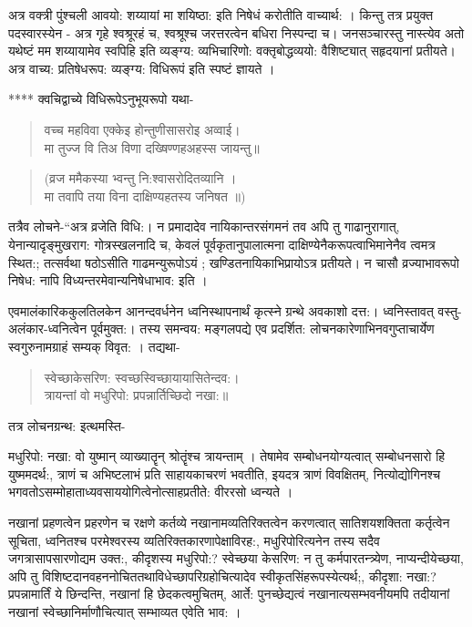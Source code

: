 अत्र वक्त्री पुंश्चली आवयो: शय्यायां मा शयिष्ठा: इति निषेधं करोतीति वाच्यार्थ: । किन्तु तत्र प्रयुक्त पदस्वारस्येन - अत्र गृहे श्वश्रूरहं च, श्वश्रूश्च जरत्तरत्वेन बधिरा निस्पन्दा च। जनसञ्चारस्तु नास्त्येव अतो यथेष्टं मम शय्यायामेव स्वपिहि इति व्यङ्ग्य: व्यभिचारिणो: वक्तृबोद्धव्ययो: वैशिष्ट्यात् सहृदयानां प्रतीयते। अत्र वाच्य: प्रतिषेधरूप: व्यङ्ग्य: विधिरूपं इति स्पष्टं ज्ञायते ।

****
क्वचिद्वाच्ये विधिरूपेऽनुभूयरूपो यथा-
\begin{verse}
वच्च महविवा एक्केइ होन्तुणीसासरोइ अव्वाई।\\
मा तुज्ज वि तिअ विणा दख्षिण्णहअहस्स जायन्तु॥
\end{verse}
\begin{verse}
(व्रज ममैकस्या भ्वन्तु नि:श्वासरोदितव्यानि ।\\
मा तवापि तया विना दाक्षिण्यहतस्य जनिषत ॥)
\end{verse}
तत्रैव लोचने-“अत्र व्रजेति विधि:। न प्रमादादेव नायिकान्तरसंगमनं तव अपि तु गाढानुरागात्, येनान्यादृङ्मुखराग: गोत्रस्खलनादि च, केवलं पूर्वकृतानुपालात्मना दाक्षिण्येनैकरूपत्वाभिमानेनैव त्वमत्र स्थित:; तत्सर्वथा षठोऽसीति गाढमन्युरूपोऽयं ; खण्डितनायिकाभिप्रायोऽत्र प्रतीयते। न चासौ व्रज्याभावरूपो निषेध: नापि विध्यन्तरमेवान्यनिषेधाभाव: इति ।

एवमालंकारिककुलतिलकेन आनन्दवर्धनेन ध्वनिस्थापनार्थं कृत्स्ने ग्रन्थे अवकाशो दत्त:। ध्वनिस्तावत् वस्तु-अलंकार-ध्वनित्वेन पूर्वमुक्त:। तस्य समन्वय: मङ्गलपद्ये एव प्रदर्शित: लोचनकारेणाभिनवगुप्ताचार्येण स्वगुरुनामग्राहं सम्यक् विवृत: । तद्यथा-
\begin{verse}
स्वेच्छाकेसरिण: स्वच्छस्विच्छायायासितेन्दव:।\\
त्रायन्तां वो मधुरिपो: प्रपन्नार्तिच्छिदो नखा:॥
\end{verse}
तत्र लोचनग्रन्थ: इत्थमस्ति-

मधुरिपो: नखा: वो युष्मान् व्याख्यातॄन् श्रोतॄंश्च त्रायन्ताम् । तेषामेव सम्बोधनयोग्यत्वात् सम्बोधनसारो हि युष्ममदर्थ:, त्राणं च अभिष्टलाभं प्रति साहायकाचरणं भवतीति, इयदत्र त्राणं विवक्षितम्, नित्योद्योगिनश्च भगवतोऽसम्मोहाताध्यवसाययोगित्वेनोत्साहप्रतीते: वीररसो ध्वन्यते ।

नखानां प्रहणत्वेन प्रहरणेन च रक्षणे कर्तव्ये नखानामव्यतिरिक्तत्वेन करणत्वात् सातिशयशक्तिता कर्तृत्वेन सूचिता, ध्वनितश्च परमेश्वरस्य व्यतिरिक्तकारणापेक्षाविरह:, मधुरिपोरित्यनेन तस्य सदैव जगत्रासापसारणोद्यम उक्त:, कीदृशस्य मधुरिपो:? स्वेच्छया केसरिण: न तु कर्मपारतन्त्र्येण, नाप्यन्दीयेच्छया, अपि तु विशिष्टदानवहननोचिततथाविधेच्छापरिग्रहोचित्यादेव स्वीकृतसिंहरूपस्येत्यर्थ;, कीदृशा: नखा:? प्रपन्नामार्तिं ये छिन्दन्ति, नखानां हि छेदकत्वमुचितम्, आर्ते: पुनच्छेद्यत्वं नखानात्यसम्भवनीयमपि तदीयानां नखानां स्वेच्छानिर्माणौचित्यात् सम्भाव्यत एवेति भाव: ।

